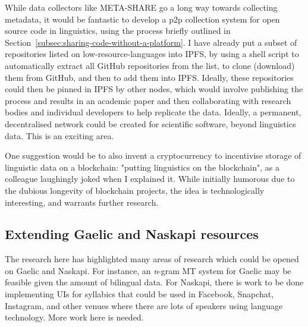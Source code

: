While data collectors like META-SHARE go a long way towards collecting metadata, it would be fantastic to develop a p2p collection system for open source code in linguistics, using the process briefly outlined in Section~\ref{subsec:sharing-code-without-a-platform}. I have already put a subset of repositories listed on low-resource-languages into IPFS, by using a shell script to automatically extract all GitHub repositories from the list, to clone (download) them from GitHub, and then to add them into IPFS. Ideally, these repositories could then be pinned in IPFS by other nodes, which would involve publishing the process and results in an academic paper and then collaborating with research bodies and individual developers to help replicate the data. Ideally, a permanent, decentralised network could be created for scientific software, beyond linguistics data. This is an exciting area.

One suggestion would be to also invent a cryptocurrency to incentivise storage of linguistic data on a blockchain: "putting linguistics on the blockchain", as a colleague laughingly joked when I explained it. While initially humorous due to the dubious longevity of blockchain projects, the idea is technologically interesting, and warrants further research.

\subsection{Extending Gaelic and Naskapi resources}

The research here has highlighted many areas of research which could be opened on Gaelic and Naskapi. For instance, an {\it n}-gram MT system for Gaelic may be feasible given the amount of bilingual data. For Naskapi, there is work to be done implementing UIs for syllabics that could be used in Facebook, Snapchat, Instagram, and other venues where there are lots of speakers using language technology. More work here is needed.

%
%
%
%


